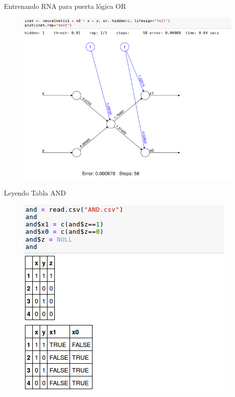 \documentclass{beamer}
\begin{document}
\begin{frame}
\begin{block}{Entrenando RNA para puerta lógica OR}
\begin{figure}
\includegraphics[scale=0.4]{neuralnetor.png}
\centering
\end{figure}
\end{block}
\end{frame}


\begin{frame}
\begin{block}{Leyendo Tabla AND}
\begin{figure}
\includegraphics[scale=0.4]{readand.png}
\centering
\end{figure}
\end{block}
\end{frame}
\end{document}
